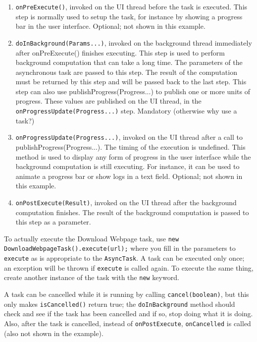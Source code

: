 \begin{enumerate}
\item \texttt{onPreExecute()}, invoked on the UI thread before the task is executed. This step is normally used to setup the task, for instance by showing a progress bar in the user interface. Optional; not shown in this example.
\item \texttt{doInBackground(Params...)}, invoked on the background thread immediately after onPreExecute() finishes executing. This step is used to perform background computation that can take a long time. The parameters of the asynchronous task are passed to this step. The result of the computation must be returned by this step and will be passed back to the last step. This step can also use publishProgress(Progress...) to publish one or more units of progress. These values are published on the UI thread, in the \texttt{onProgressUpdate(Progress...)} step. Mandatory (otherwise why use a task?)
\item \texttt{onProgressUpdate(Progress...)}, invoked on the UI thread after a call to publishProgress(Progress...). The timing of the execution is undefined. This method is used to display any form of progress in the user interface while the background computation is still executing. For instance, it can be used to animate a progress bar or show logs in a text field. Optional; not shown in this example.
\item \texttt{onPostExecute(Result)}, invoked on the UI thread after the background computation finishes. The result of the background computation is passed to this step as a parameter.
\end{enumerate}

To actually execute the Download Webpage task, use \texttt{new DownloadWebpageTask().execute(url);} where you fill in the parameters to \texttt{execute} as is appropriate to the \texttt{AsyncTask}. A task can be executed only once; an exception will be thrown if \texttt{execute} is called again. To execute the same thing, create another instance of the task with the \texttt{new} keyword.

A task can be cancelled while it is running by calling \texttt{cancel(boolean)}, but this only makes \texttt{isCancelled()} return true; the \texttt{doInBackground} method should check and see if the task has been cancelled and if so, stop doing what it is doing. Also, after the task is cancelled, instead of \texttt{onPostExecute}, \texttt{onCancelled} is called (also not shown in the example).



